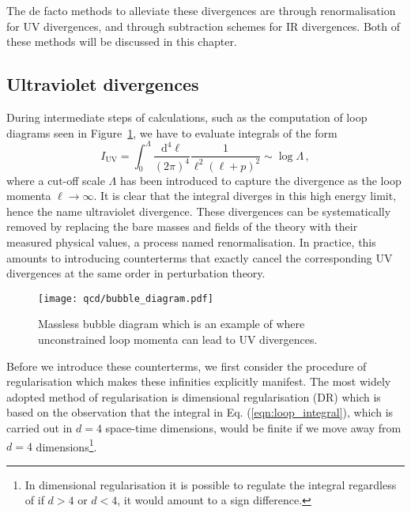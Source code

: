 \documentclass[main.tex]{subfiles}
\begin{document}
    The de facto methods to alleviate these
    divergences are through renormalisation
    for UV divergences, and through subtraction
    schemes for IR divergences. Both of these
    methods will be discussed in this chapter.

\subsection{Ultraviolet divergences}\label{sec:UV}
    During intermediate steps of calculations,
    such as the computation of loop diagrams seen in
    Figure~\ref{fig:bubble_diagram},
    we have to evaluate integrals of the form
    \begin{equation}\label{eqn:loop_integral}
        I_{\mathrm{UV}} = \int_{0}^{\Lambda} \dfrac{\mathrm{d}^{4}\ell}{(2\pi)^{4}}\dfrac{1}{\ell^{2}(\ell+p)^{2}} \sim \log{\Lambda} \, ,
    \end{equation}
    where a cut-off scale $\Lambda$ has been introduced to
    capture the divergence as the loop momenta
    $\ell \rightarrow \infty$. It is clear that the
    integral diverges in this high energy limit,
    hence the name ultraviolet divergence.
    These divergences can be systematically
    removed by replacing the bare masses
    and fields of the theory with their measured
    physical values, a process named renormalisation.
    In practice, this amounts to introducing
    counterterms that exactly cancel the corresponding
    UV divergences at the same order in perturbation
    theory.

    \begin{figure}
        \texttt{[image: qcd/bubble\_diagram.pdf]}
        \caption{Massless bubble diagram which is an example of where unconstrained
        loop momenta can lead to UV divergences.}
        \label{fig:bubble_diagram}
    \end{figure}

    Before we introduce these counterterms, we
    first consider the procedure of regularisation
    which makes these infinities explicitly manifest.
    The most widely adopted method of regularisation
    is dimensional regularisation (DR) \cite{tHooft:1972tcz} which
    is based on the observation that the integral
    in Eq. (\ref{eqn:loop_integral}), which is carried
    out in $d=4$ space-time dimensions, would be finite
    if we move away from $d=4$ dimensions\footnote{In dimensional regularisation it is possible to regulate
    the integral regardless of if $d > 4$ or $d < 4$, it would amount
    to a sign difference.}.
\end{document}
